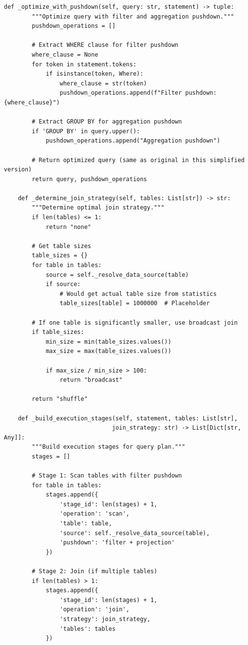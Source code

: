 \begin{lstlisting}[style=python, caption=DataVirtualizer with Federated Queries]
    def _optimize_with_pushdown(self, query: str, statement) -> tuple:
        """Optimize query with filter and aggregation pushdown."""
        pushdown_operations = []

        # Extract WHERE clause for filter pushdown
        where_clause = None
        for token in statement.tokens:
            if isinstance(token, Where):
                where_clause = str(token)
                pushdown_operations.append(f"Filter pushdown: {where_clause}")

        # Extract GROUP BY for aggregation pushdown
        if 'GROUP BY' in query.upper():
            pushdown_operations.append("Aggregation pushdown")

        # Return optimized query (same as original in this simplified version)
        return query, pushdown_operations

    def _determine_join_strategy(self, tables: List[str]) -> str:
        """Determine optimal join strategy."""
        if len(tables) <= 1:
            return "none"

        # Get table sizes
        table_sizes = {}
        for table in tables:
            source = self._resolve_data_source(table)
            if source:
                # Would get actual table size from statistics
                table_sizes[table] = 1000000  # Placeholder

        # If one table is significantly smaller, use broadcast join
        if table_sizes:
            min_size = min(table_sizes.values())
            max_size = max(table_sizes.values())

            if max_size / min_size > 100:
                return "broadcast"

        return "shuffle"

    def _build_execution_stages(self, statement, tables: List[str],
                               join_strategy: str) -> List[Dict[str, Any]]:
        """Build execution stages for query plan."""
        stages = []

        # Stage 1: Scan tables with filter pushdown
        for table in tables:
            stages.append({
                'stage_id': len(stages) + 1,
                'operation': 'scan',
                'table': table,
                'source': self._resolve_data_source(table),
                'pushdown': 'filter + projection'
            })

        # Stage 2: Join (if multiple tables)
        if len(tables) > 1:
            stages.append({
                'stage_id': len(stages) + 1,
                'operation': 'join',
                'strategy': join_strategy,
                'tables': tables
            })


\end{lstlisting}
